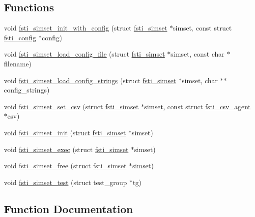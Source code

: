 \subsection*{Functions}
\begin{DoxyCompactItemize}
\item 
void \mbox{\hyperlink{fsti-simset_8h_a1cb3469742605ad3883f1b94f1f681ed}{fsti\+\_\+simset\+\_\+init\+\_\+with\+\_\+config}} (struct \mbox{\hyperlink{structfsti__simset}{fsti\+\_\+simset}} $\ast$simset, const struct \mbox{\hyperlink{structfsti__config}{fsti\+\_\+config}} $\ast$config)
\item 
void \mbox{\hyperlink{fsti-simset_8h_a8635ad080108f9d35e1e0f01d9e7c855}{fsti\+\_\+simset\+\_\+load\+\_\+config\+\_\+file}} (struct \mbox{\hyperlink{structfsti__simset}{fsti\+\_\+simset}} $\ast$simset, const char $\ast$filename)
\item 
void \mbox{\hyperlink{fsti-simset_8h_ab81c9af7043163aa922dd03128d18f91}{fsti\+\_\+simset\+\_\+load\+\_\+config\+\_\+strings}} (struct \mbox{\hyperlink{structfsti__simset}{fsti\+\_\+simset}} $\ast$simset, char $\ast$$\ast$config\+\_\+strings)
\item 
void \mbox{\hyperlink{fsti-simset_8h_a08f81ac2f9dab77ce689ffb90499d4c5}{fsti\+\_\+simset\+\_\+set\+\_\+csv}} (struct \mbox{\hyperlink{structfsti__simset}{fsti\+\_\+simset}} $\ast$simset, const struct \mbox{\hyperlink{structfsti__csv__agent}{fsti\+\_\+csv\+\_\+agent}} $\ast$csv)
\item 
void \mbox{\hyperlink{fsti-simset_8h_ae663244aa372d7aec96fc021986b5cd3}{fsti\+\_\+simset\+\_\+init}} (struct \mbox{\hyperlink{structfsti__simset}{fsti\+\_\+simset}} $\ast$simset)
\item 
void \mbox{\hyperlink{fsti-simset_8h_ab874d71469d5e16d9dbff4aea5faf945}{fsti\+\_\+simset\+\_\+exec}} (struct \mbox{\hyperlink{structfsti__simset}{fsti\+\_\+simset}} $\ast$simset)
\item 
void \mbox{\hyperlink{fsti-simset_8h_aea0fceda1ad3ad46c434837f7eee4fb4}{fsti\+\_\+simset\+\_\+free}} (struct \mbox{\hyperlink{structfsti__simset}{fsti\+\_\+simset}} $\ast$simset)
\item 
void \mbox{\hyperlink{fsti-simset_8h_a14d71a5961f0b595d706a5a43e7350d3}{fsti\+\_\+simset\+\_\+test}} (struct test\+\_\+group $\ast$tg)
\end{DoxyCompactItemize}


\subsection{Function Documentation}
\mbox{\label{fsti-simset_8h_ab874d71469d5e16d9dbff4aea5faf945}} 
